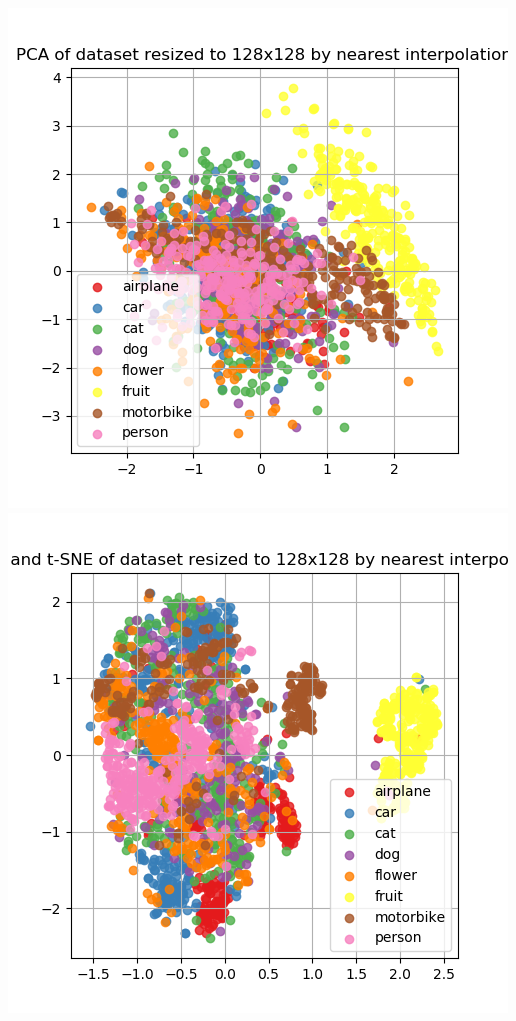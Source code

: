 \documentclass{article}
\begin{document}
\begin{minipage}[c]{\textwidth}
	\includegraphics[width= \figureWidth\textwidth]{./figures/pca_h128_w128_r_none.png}
	\includegraphics[width= \figureWidth\textwidth]{./figures/pca_tsne_h128_w128_r_none.png}

\end{minipage}
\end{document}
